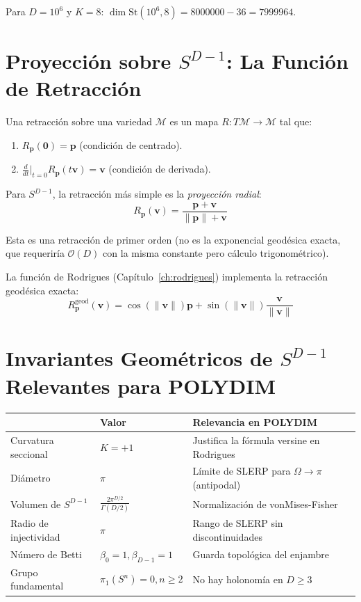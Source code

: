 Para $D = 10^6$ y $K = 8$: $\dim \text{St}(10^6, 8) = 8000000 - 36 = 7999964$.

\section{Proyección sobre $S^{D-1}$: La Función de Retracción}

\begin{definition}[Retracción]
Una retracción sobre una variedad $\mathcal{M}$ es un mapa $R: T\mathcal{M} \to \mathcal{M}$
tal que:
\begin{enumerate}
\item $R_{\mathbf{p}}(\mathbf{0}) = \mathbf{p}$ (condición de centrado).
\item $\frac{d}{dt}\Big|_{t=0} R_{\mathbf{p}}(t\mathbf{v}) = \mathbf{v}$ (condición de derivada).
\end{enumerate}
\end{definition}

Para $S^{D-1}$, la retracción más simple es la \textit{proyección radial}:
\begin{equation}
R_{\mathbf{p}}(\mathbf{v}) = \frac{\mathbf{p} + \mathbf{v}}{\|{\mathbf{p}\| + \mathbf{v}}}

\end{equation}

Esta es una retracción de primer orden (no es la exponencial geodésica exacta,
que requeriría $\mathcal{O}(D)$ con la misma constante pero cálculo trigonométrico).

La función de Rodrigues (Capítulo~\ref{ch:rodrigues}) implementa la retracción
geodésica exacta:
\begin{equation}
R_{\mathbf{p}}^{\text{geod}}(\mathbf{v}) = \cos(\|{\mathbf{v}\|})\mathbf{p} + \sin(\|{\mathbf{v}\|})\frac{\mathbf{v}}{\|{\mathbf{v}\|}}

\end{equation}

\section{Invariantes Geométricos de $S^{D-1}$ Relevantes para POLYDIM}

\begin{tabular}{llll}}
\hline
\textbf{Invariante} & \textbf{Valor} & \textbf{Relevancia en POLYDIM} \\
\hline
Curvatura seccional & $K = +1$ & Justifica la fórmula versine en Rodrigues \\
Diámetro & $\pi$ & Límite de SLERP para $\Omega \to \pi$ (antipodal) \\
Volumen de $S^{D-1}$ & $\frac{2\pi^{D/2}}{\Gamma(D/2)}$ & Normalización de vonMises-Fisher \\
Radio de injectividad & $\pi$ & Rango de SLERP sin discontinuidades \\
Número de Betti & $\beta_0=1, \beta_{D-1}=1$ & Guarda topológica del enjambre \\
Grupo fundamental & $\pi_1(S^n)=0, n\ge 2$ & No hay holonomía en $D \ge 3$ \\
\hline


\end{tabular}

